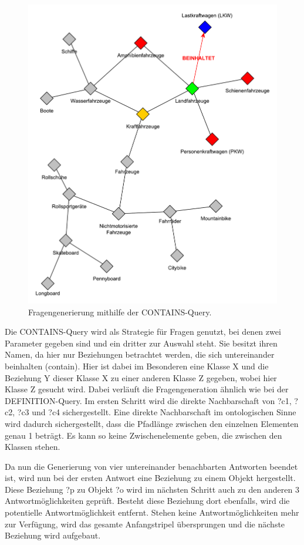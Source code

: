 \documentclass[headsepline,titlepage,ngerman,twoside,12pt]{report}
\begin{document}
\begin{figure}
\centering
\includegraphics[width=\textwidth]{images/contains.pdf}
\caption{Fragengenerierung mithilfe der CONTAINS-Query.}
\label{img:contains-query-prototype}
\end{figure}

Die CONTAINS-Query wird als Strategie für Fragen genutzt, bei denen zwei Parameter gegeben sind und ein dritter zur Auswahl steht.
Sie besitzt ihren Namen, da hier nur Beziehungen betrachtet werden, die sich untereinander beinhalten (contain).
Hier ist dabei im Besonderen eine Klasse X und die Beziehung Y dieser Klasse X zu einer anderen Klasse Z gegeben, wobei hier Klasse Z gesucht wird.
Dabei verläuft die Fragengeneration ähnlich wie bei der DEFINITION-Query.
Im ersten Schritt wird die direkte Nachbarschaft von ?c1, ?c2, ?c3 und ?c4 sichergestellt. 
Eine direkte Nachbarschaft im ontologischen Sinne wird dadurch sichergestellt, dass die Pfadlänge zwischen den einzelnen Elementen genau 1 beträgt.
Es kann so keine Zwischenelemente geben, die zwischen den Klassen stehen.

Da nun die Generierung von vier untereinander benachbarten Antworten beendet ist, wird nun bei der ersten Antwort eine Beziehung zu einem Objekt hergestellt.
Diese Beziehung ?p zu Objekt ?o wird im nächsten Schritt auch zu den anderen 3 Antwortmöglichkeiten geprüft.
Besteht diese Beziehung dort ebenfalls, wird die potentielle Antwortmöglichkeit entfernt.
Stehen keine Antwortmöglichkeiten mehr zur Verfügung, wird das gesamte Anfangstripel übersprungen und die nächste Beziehung wird aufgebaut.
\end{document}
